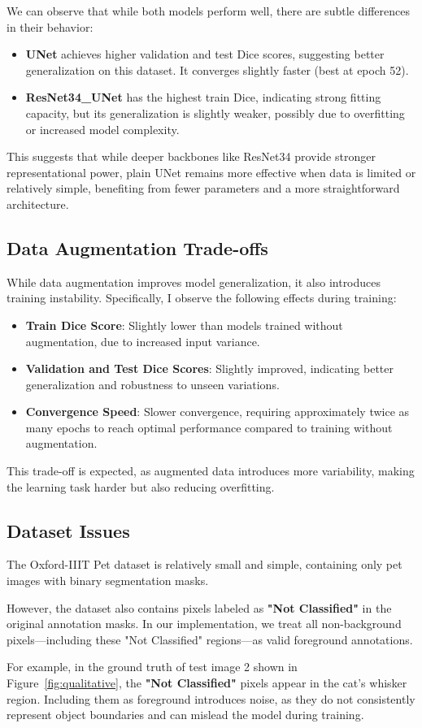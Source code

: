 \documentclass{homework}
\begin{document}
We can observe that while both models perform well, there are subtle differences in their behavior:

\begin{itemize}
    \item \textbf{UNet} achieves higher validation and test Dice scores, suggesting better generalization on this dataset. It converges slightly faster (best at epoch 52).
    \item \textbf{ResNet34\_UNet} has the highest train Dice, indicating strong fitting capacity, but its generalization is slightly weaker, possibly due to overfitting or increased model complexity.
\end{itemize}

This suggests that while deeper backbones like ResNet34 provide stronger representational power, plain UNet remains more effective when data is limited or relatively simple, benefiting from fewer parameters and a more straightforward architecture.

\subsection{Data Augmentation Trade-offs}

While data augmentation improves model generalization, it also introduces training instability. Specifically, I observe the following effects during training:

\begin{itemize}
    \item \textbf{Train Dice Score}: Slightly lower than models trained without augmentation, due to increased input variance.
    \item \textbf{Validation and Test Dice Scores}: Slightly improved, indicating better generalization and robustness to unseen variations.
    \item \textbf{Convergence Speed}: Slower convergence, requiring approximately twice as many epochs to reach optimal performance compared to training without augmentation.
\end{itemize}

This trade-off is expected, as augmented data introduces more variability, making the learning task harder but also reducing overfitting.

\subsection{Dataset Issues}

The Oxford-IIIT Pet dataset is relatively small and simple, containing only pet images with binary segmentation masks. 

However, the dataset also contains pixels labeled as \textbf{"Not Classified"} in the original annotation masks. In our implementation, we treat all non-background pixels—including these "Not Classified" regions—as valid foreground annotations.

For example, in the ground truth of test image 2 shown in Figure~\ref{fig:qualitative}, the \textbf{"Not Classified"} pixels appear in the cat's whisker region. Including them as foreground introduces noise, as they do not consistently represent object boundaries and can mislead the model during training.
\end{document}
